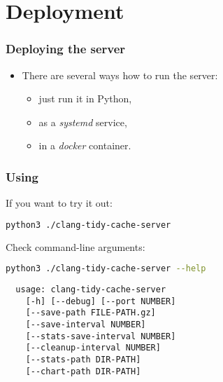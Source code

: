 \documentclass[compress,table,xcolor=table]{beamer}
\begin{document}
\section{Deployment}
\begin{frame}
  \Huge
\end{frame}
\begin{frame}
  \frametitle{Deploying the server}
  \LARGE
  \begin{itemize}
  \item There are several ways how to run the server:
    \begin{itemize}
    \item just run it in Python,
    \item as a {\em systemd} service,
    \item in a {\em docker} container.
    \end{itemize}
  \end{itemize}
\end{frame}
\begin{frame}[fragile]
  \frametitle{Using }
  \Large
  If you want to try it out:
  \begin{lstlisting}[language=bash]
  python3 ./clang-tidy-cache-server 
  \end{lstlisting}
  Check command-line arguments:
  \begin{lstlisting}[language=bash]
  python3 ./clang-tidy-cache-server --help
  \end{lstlisting}
  \normalsize
  \begin{verbatim}
  usage: clang-tidy-cache-server
    [-h] [--debug] [--port NUMBER]
    [--save-path FILE-PATH.gz]
    [--save-interval NUMBER]
    [--stats-save-interval NUMBER]
    [--cleanup-interval NUMBER]
    [--stats-path DIR-PATH]
    [--chart-path DIR-PATH]
  \end{verbatim}
\end{frame}
\end{document}
